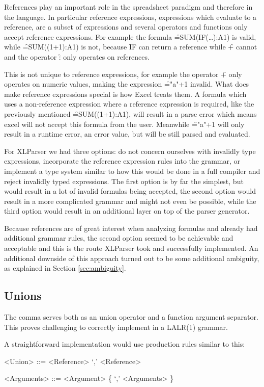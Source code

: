 References play an important role in the spreadsheet paradigm and therefore in the language.
In particular reference expressions, expressions which evaluate to a reference, are a subset of expressions and several operators and functions only accept reference expressions.
For example the formula \f{=SUM(IF(\ldots):A1)} is valid, while \f{=SUM((1+1):A1)} is not, because \f{IF} can return a reference while \f{+} cannot and the operator \f{:} only operates on references.

This is not unique to reference expressions, for example the operator \f{+} only operates on numeric values, making the expression \f{="a"+1} invalid.
What does make reference expressions special is how Excel treats them.
A formula which uses a non-reference expression where a reference expression is required, like the previously mentioned \f{=SUM((1+1):A1)}, will result in a parse error which means excel will not accept this formula from the user.
Meanwhile \f{="a"+1} will only result in a runtime error, an error value, but will be still parsed and evaluated.

For XLParser we had three options: do not concern ourselves with invalidly type expressions, incorporate the reference expression rules into the grammar, or implement a type system similar to how this would be done in a full compiler and reject invalidly typed expressions.
The first option is by far the simplest, but would result in a lot of invalid formulas being accepted, the second option would result in a more complicated grammar and might not even be possible, while the third option would result in an additional layer on top of the parser generator.

Because references are of great interest when analyzing formulas and already had additional grammar rules, the second option seemed to be achievable and acceptable and this is the route XLParser took and successfully implemented.
An additional downside of this approach turned out to be some additional ambiguity, as explained in Section \ref{sec:ambiguity}.

\subsection{Unions}
\label{subsec:desing:unions}

The comma serves both as an union operator and a function argument separator.
This proves challenging to correctly implement in a LALR(1) grammar.

A straightforward implementation would use production rules similar to this:
\begin{grammar}
<Union> ::= <Reference> `,' <Reference>

<Arguments> ::= <Argument> \{ `,' <Arguments> \}
\end{grammar}

